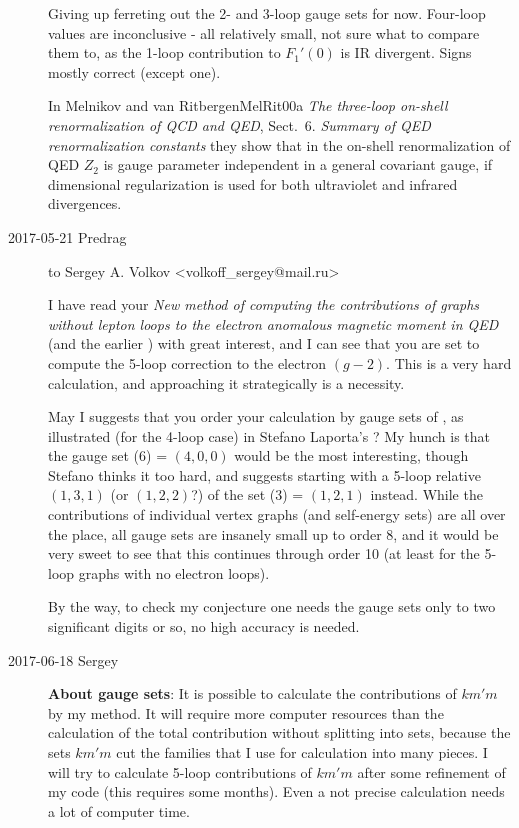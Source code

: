 \begin{description}
Giving up ferreting out the 2- and 3-loop gauge sets for now. Four-loop
values are inconclusive - all relatively small, not sure what to
compare them to, as the 1-loop contribution to $F_1'(0)$ is IR divergent.
Signs mostly correct (except one).

In Melnikov and van Ritbergen{MelRit00a}
 {\em The three-loop on-shell renormalization of {QCD} and {QED}},
 Sect.~6.  {\em Summary of QED renormalization constants} they show that
 in the on-shell renormalization of QED $Z_2$ is gauge parameter
 independent in a general covariant gauge, if dimensional regularization
 is used for both ultraviolet and infrared divergences.

\item[2017-05-21 Predrag] to
Sergey  A. Volkov <volkoff\_sergey@mail.ru>
%

I have read your
{\em New method of computing the contributions of graphs without lepton
loops to the electron anomalous magnetic moment in {QED}}
(and the earlier ) with great interest, and I can see
that you are set to compute the 5-loop correction to the electron
$(g-2)$. This is a very hard calculation, and approaching it
strategically is a necessity.

May I suggests that you order your calculation by gauge sets of
, as illustrated (for the 4-loop case) in Stefano
Laporta's ? My hunch is that the gauge
set (6) = $(4,0,0)$ would be the most interesting, though Stefano thinks
it too hard, and suggests starting with a 5-loop relative $(1,3,1)$ (or
$(1,2,2)$?) of the set (3) = $(1,2,1)$ instead. While the contributions
of individual vertex graphs (and self-energy sets) are all
over the place, all gauge sets are insanely small up to order
8, and it would be very sweet to see that this continues through order 10
(at least for the 5-loop graphs with no electron loops).

By the way, to check my conjecture one needs the gauge sets only to two
significant digits or so, no high accuracy is needed.

\item[2017-06-18 Sergey]
\textbf{About gauge sets}:
It is possible to calculate the contributions of $km'm$ by my
method. It will require more computer resources than the calculation of
the total contribution without splitting into sets, because the sets
$km'm$ cut the families that I use for calculation into many pieces.
I will try to calculate 5-loop contributions of $km'm$ after
some refinement of my code (this requires some months). Even a not
precise calculation needs a lot of computer time.


\end{description}
